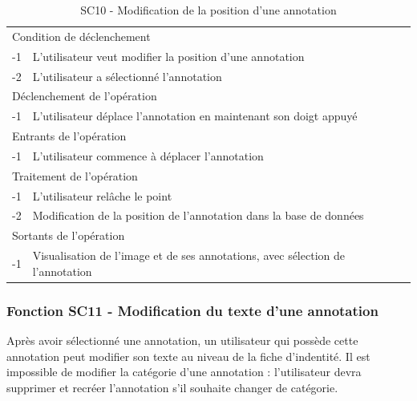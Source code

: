 \documentclass[a4paper]{article}
\begin{document}
\begin{table}[H]
  \centering
   \small
	\begin{tabular}{|c|p{12cm}|}
   		\hline
   			\rowcolor{lightgray}\multicolumn{2}{|c|}{\textbf{SC10 - Modification de la position d’une annotation}} \\
   		\hline
   			\multicolumn{2}{|l|}{Condition de d\'eclenchement} \\
   		\hline
   			-1 & L’utilisateur veut modifier la position d’une annotation\\
			-2 & L’utilisateur a sélectionné l’annotation\\
   		\hline
   			\multicolumn{2}{|l|}{D\'eclenchement de l'op\'eration} \\
   		\hline
   			-1 & L’utilisateur déplace l’annotation en maintenant son doigt appuyé\\
   		\hline
   			\multicolumn{2}{|l|}{Entrants de l'op\'eration} \\
   		\hline
   			-1 & L’utilisateur commence à déplacer l’annotation\\
   		\hline
   			\multicolumn{2}{|l|}{Traitement de l'op\'eration} \\
  		\hline
   			-1 & L’utilisateur relâche le point\\
			-2 & Modification de la position de l’annotation dans la base de données\\
   		\hline
   			\multicolumn{2}{|l|}{Sortants de l'op\'eration} \\
   		\hline
   			-1 & Visualisation de l’image et de ses annotations, avec sélection de l’annotation\\
   		\hline
	\end{tabular}
  \caption{SC10 - Modification de la position d’une annotation}
  \normalsize
  \label{tab:modification_position_annotation}
\end{table}

\subsubsection{Fonction SC11 - Modification du texte d’une annotation}
Après avoir sélectionné une annotation, un utilisateur qui possède cette annotation peut modifier son texte au niveau de la fiche d'indentité. Il est impossible de modifier la catégorie d'une annotation : l'utilisateur devra supprimer et recréer l'annotation s'il souhaite changer de catégorie.\\
\end{document}
